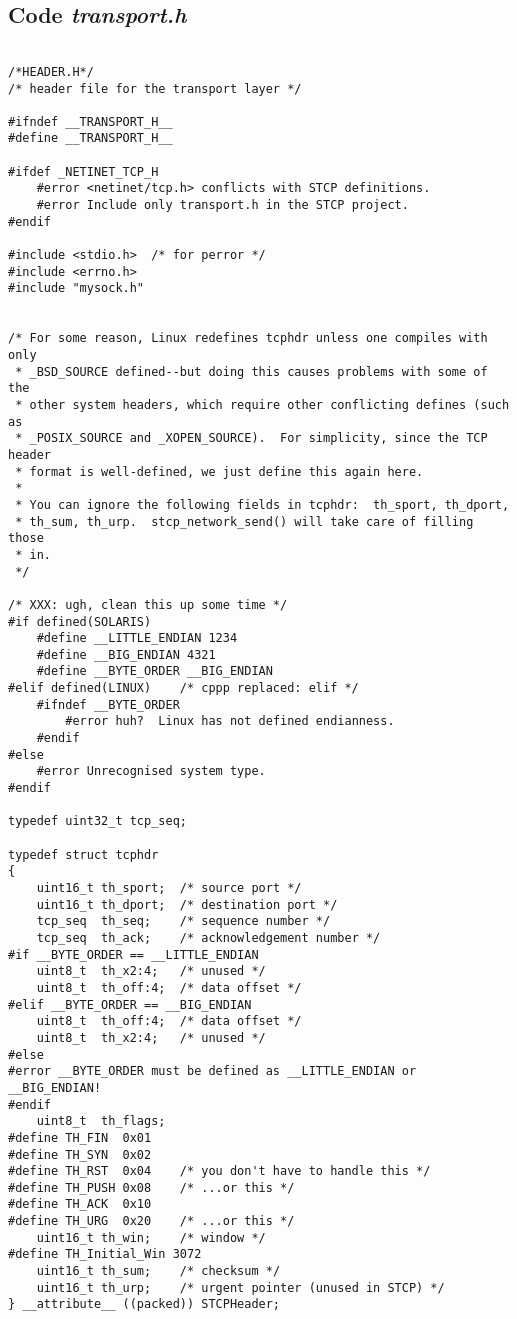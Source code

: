 \documentclass[11pt,a4paper,titlepage]{article}
\begin{document}
\subsection{Code \textit{transport.h}}
\begin{lstlisting}

/*HEADER.H*/
/* header file for the transport layer */

#ifndef __TRANSPORT_H__
#define __TRANSPORT_H__

#ifdef _NETINET_TCP_H
    #error <netinet/tcp.h> conflicts with STCP definitions.
    #error Include only transport.h in the STCP project.
#endif

#include <stdio.h>  /* for perror */
#include <errno.h>
#include "mysock.h"


/* For some reason, Linux redefines tcphdr unless one compiles with only
 * _BSD_SOURCE defined--but doing this causes problems with some of the
 * other system headers, which require other conflicting defines (such as
 * _POSIX_SOURCE and _XOPEN_SOURCE).  For simplicity, since the TCP header
 * format is well-defined, we just define this again here.
 *
 * You can ignore the following fields in tcphdr:  th_sport, th_dport,
 * th_sum, th_urp.  stcp_network_send() will take care of filling those
 * in.
 */

/* XXX: ugh, clean this up some time */
#if defined(SOLARIS)
    #define __LITTLE_ENDIAN 1234
    #define __BIG_ENDIAN 4321
    #define __BYTE_ORDER __BIG_ENDIAN
#elif defined(LINUX)	/* cppp replaced: elif */
    #ifndef __BYTE_ORDER
        #error huh?  Linux has not defined endianness.
    #endif
#else
    #error Unrecognised system type.
#endif

typedef uint32_t tcp_seq;

typedef struct tcphdr
{
    uint16_t th_sport;  /* source port */
    uint16_t th_dport;  /* destination port */
    tcp_seq  th_seq;    /* sequence number */
    tcp_seq  th_ack;    /* acknowledgement number */
#if __BYTE_ORDER == __LITTLE_ENDIAN
    uint8_t  th_x2:4;   /* unused */
    uint8_t  th_off:4;  /* data offset */
#elif __BYTE_ORDER == __BIG_ENDIAN
    uint8_t  th_off:4;  /* data offset */
    uint8_t  th_x2:4;   /* unused */
#else
#error __BYTE_ORDER must be defined as __LITTLE_ENDIAN or __BIG_ENDIAN!
#endif
    uint8_t  th_flags;
#define TH_FIN  0x01
#define TH_SYN  0x02
#define TH_RST  0x04    /* you don't have to handle this */
#define TH_PUSH 0x08    /* ...or this */
#define TH_ACK  0x10
#define TH_URG  0x20    /* ...or this */
    uint16_t th_win;    /* window */
#define TH_Initial_Win 3072
    uint16_t th_sum;    /* checksum */
    uint16_t th_urp;    /* urgent pointer (unused in STCP) */
} __attribute__ ((packed)) STCPHeader;



\end{lstlisting}
\end{document}
